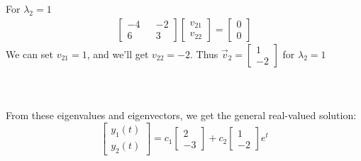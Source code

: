 \documentclass[12pt]{article}
\begin{document}
For $\lambda_2 = 1$
\begin{align*}
\begin{bmatrix}
-4 && -2 \\ 6 && 3
\end{bmatrix}
\begin{bmatrix}
v_{21} \\ v_{22}
\end{bmatrix}
= 
\begin{bmatrix}
0 \\ 0
\end{bmatrix}
\end{align*} 
We can set $v_{21} = 1$, and we'll get $v_{22} = -2$. Thus $\vec{v}_2 = \begin{bmatrix}	1 \\ -2	\end{bmatrix}$ for $\lambda_2 = 1$
\\ \\ \\ \\
From these eigenvalues and eigenvectors, we get the general real-valued solution:
$$
\begin{bmatrix} y_1(t) \\ y_2(t) \end{bmatrix} =
c_1 \begin{bmatrix}	2 \\ -3	\end{bmatrix} +
c_2 \begin{bmatrix}	1 \\ -2	\end{bmatrix} e^{t}
$$

\newpage 
\end{document}
